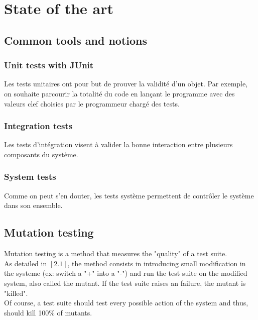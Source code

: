 \documentclass[a4paper]{report}
\begin{document}




\chapter*{State of the art}


\section*{Common tools and notions}

\subsection*{Unit tests with JUnit}
Les tests unitaires ont pour but de prouver la validité d'un objet. Par exemple, on souhaite parcourir la totalité du code en lançant le programme avec des valeurs clef choisies par le programmeur chargé des tests.

\subsection*{Integration tests}
Les tests d'intégration visent à valider la bonne interaction entre plusieurs composants du système.

\subsection*{System tests}
Comme on peut s'en douter, les tests système permettent de contrôler le système dans son ensemble.


\section*{Mutation testing}
Mutation testing is a method that measures the "quality" of a test suite.\\
As detailed in $[2.1]$, the method consists in introducing small modification in the systeme (ex: switch a "+" into a "-") and run the test suite on the modified system, also called the mutant. If the test suite raises an failure, the mutant is "killed".\\
Of course, a test suite should test every possible action of the system and thus, should kill 100\% of mutants.
\end{document}
